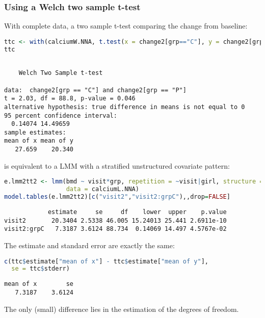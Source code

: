 \documentclass[12pt]{article}
\begin{document}
\subsubsection{Using a Welch two sample t-test}
\label{sec:org67f82a0}

With complete data, a two sample t-test comparing the change from baseline:
\begin{lstlisting}[language=r,numbers=none]
ttc <- with(calciumW.NNA, t.test(x = change2[grp=="C"], y = change2[grp=="P"]))
ttc
\end{lstlisting}

\label{}
\begin{verbatim}

	Welch Two Sample t-test

data:  change2[grp == "C"] and change2[grp == "P"]
t = 2.03, df = 88.8, p-value = 0.046
alternative hypothesis: true difference in means is not equal to 0
95 percent confidence interval:
  0.14074 14.49659
sample estimates:
mean of x mean of y 
   27.659    20.340
\end{verbatim}

is equivalent to a LMM with a stratified unstructured covariate pattern:
\begin{lstlisting}[language=r,numbers=none]
e.lmm2tt2 <- lmm(bmd ~ visit*grp, repetition = ~visit|girl, structure = UN(~grp),
                 data = calciumL.NNA)
model.tables(e.lmm2tt2)[c("visit2","visit2:grpC"),,drop=FALSE]
\end{lstlisting}

\label{}
\begin{verbatim}
            estimate     se     df    lower  upper    p.value
visit2       20.3404 2.5338 46.005 15.24013 25.441 2.6911e-10
visit2:grpC   7.3187 3.6124 88.734  0.14069 14.497 4.5767e-02
\end{verbatim}


The estimate and standard error are exactly the same:
\begin{lstlisting}[language=r,numbers=none]
c(ttc$estimate["mean of x"] - ttc$estimate["mean of y"],
  se = ttc$stderr)
\end{lstlisting}

\label{}
\begin{verbatim}
mean of x        se 
   7.3187    3.6124
\end{verbatim}


The only (small) difference lies in the estimation of the degrees of freedom.
\end{document}
